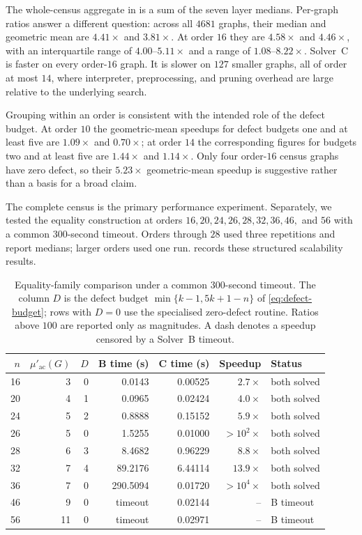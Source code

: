 \documentclass[smallextended,natbib,nospthms]{svjour3}
\theoremstyle{definition}
\theoremstyle{remark}
\newcommand{\acnum}{\mu'_{\mathrm{ac}}}
\begin{document}
The whole-census aggregate in  is a sum of the seven
layer medians. Per-graph ratios answer a different question: across all $4681$
graphs, their median and geometric mean are $4.41\times$ and $3.81\times$.
At order $16$ they are $4.58\times$ and $4.46\times$, with an interquartile
range of $4.00$--$5.11\times$ and a range of $1.08$--$8.22\times$. Solver~C
is faster on every order-$16$ graph. It is slower on $127$ smaller graphs,
all of order at most $14$, where interpreter, preprocessing, and pruning
overhead are large relative to the underlying search.

Grouping within an order is consistent with the intended role of the defect
budget. At order $10$ the geometric-mean speedups for defect budgets one and
at least five are $1.09\times$ and $0.70\times$; at order $14$ the
corresponding figures for budgets two and at least five are $1.44\times$ and
$1.14\times$. Only four order-$16$ census graphs have zero defect, so their
$5.23\times$ geometric-mean speedup is suggestive rather than a basis for a
broad claim.

The complete census is the primary performance experiment. Separately, we
tested the equality construction at orders
$16,20,24,26,28,32,36,46,$ and $56$ with a common $300$-second timeout.
Orders through $28$ used three repetitions and report medians; larger orders
used one run.  records these structured
scalability results.

\begin{table}[t]
\centering
\caption{Equality-family comparison under a common $300$-second timeout. The
column $D$ is the defect budget $\min\{k-1,5k+1-n\}$ of
\eqref{eq:defect-budget}; rows with $D=0$ use the specialised zero-defect
routine. Ratios above $100$ are reported only as magnitudes. A dash denotes a
speedup censored by a Solver~B timeout.}
\label{tab:equality-performance}
\small
\begin{tabular}{rrrrrrl}
\toprule
$n$ & $\acnum(G)$ & $D$ & B time (s) & C time (s) & Speedup & Status\\
\midrule
16 & 3  & 0 & 0.0143   & 0.00525 & $2.7\times$      & both solved\\
20 & 4  & 1 & 0.0965   & 0.02424 & $4.0\times$      & both solved\\
24 & 5  & 2 & 0.8888   & 0.15152 & $5.9\times$      & both solved\\
26 & 5  & 0 & 1.5255   & 0.01000 & ${>}10^{2}\times$ & both solved\\
28 & 6  & 3 & 8.4682   & 0.96229 & $8.8\times$      & both solved\\
32 & 7  & 4 & 89.2176  & 6.44114 & $13.9\times$     & both solved\\
36 & 7  & 0 & 290.5094 & 0.01720 & ${>}10^{4}\times$ & both solved\\
46 & 9  & 0 & timeout  & 0.02144 & --               & B timeout\\
56 & 11 & 0 & timeout  & 0.02971 & --               & B timeout\\
\bottomrule
\end{tabular}
\end{table}
\end{document}
